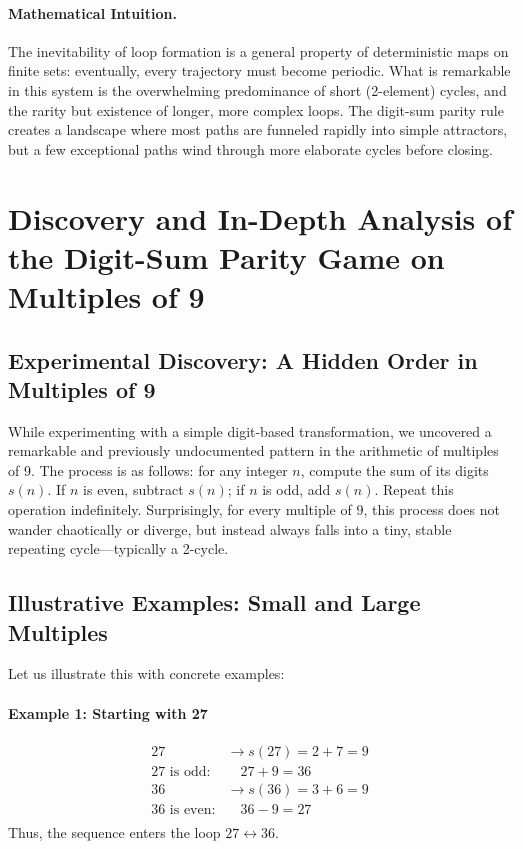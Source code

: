 \documentclass[12pt]{article}
\begin{document}
\paragraph{Mathematical Intuition.} The inevitability of loop formation is a general property of deterministic maps on finite sets: eventually, every trajectory must become periodic. What is remarkable in this system is the overwhelming predominance of short (2-element) cycles, and the rarity but existence of longer, more complex loops. The digit-sum parity rule creates a landscape where most paths are funneled rapidly into simple attractors, but a few exceptional paths wind through more elaborate cycles before closing.

\section{Discovery and In-Depth Analysis of the Digit-Sum Parity Game on Multiples of 9}

\subsection{Experimental Discovery: A Hidden Order in Multiples of 9}
While experimenting with a simple digit-based transformation, we uncovered a remarkable and previously undocumented pattern in the arithmetic of multiples of 9. The process is as follows: for any integer $n$, compute the sum of its digits $s(n)$. If $n$ is even, subtract $s(n)$; if $n$ is odd, add $s(n)$. Repeat this operation indefinitely. Surprisingly, for every multiple of 9, this process does not wander chaotically or diverge, but instead always falls into a tiny, stable repeating cycle---typically a 2-cycle.

\subsection{Illustrative Examples: Small and Large Multiples}
Let us illustrate this with concrete examples:

\paragraph{Example 1: Starting with 27}
\begin{align*}
27 &\to s(27) = 2+7 = 9 \\
27 \text{ is odd:} &\quad 27 + 9 = 36 \\
36 &\to s(36) = 3+6 = 9 \\
36 \text{ is even:} &\quad 36 - 9 = 27 \\
\end{align*}
Thus, the sequence enters the loop $27 \leftrightarrow 36$.
\end{document}
